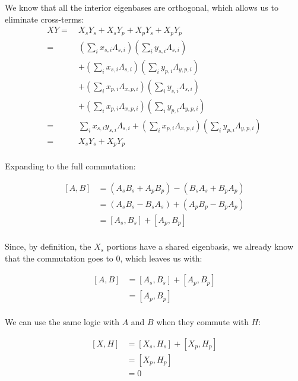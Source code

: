 \begin{answer}
\begin{answerpart}{\ctrois{}}
    We know that all the interior eigenbases are orthogonal, which
    allows us to eliminate cross-terms:
    \begin{equation}
      \begin{split}
        XY
        =\ &X_sY_s + X_sY_p + X_pY_s + X_pY_p\\
        =\ &(\sum_i x_{s,i}\Lambda_{s,i})(\sum_i y_{s,i}\Lambda_{s,i})\\
        &+ (\sum_i x_{s,i}\Lambda_{s,i})(\sum_i y_{p,i}\Lambda_{y,p,i})\\
        &+ (\sum_i x_{p,i}\Lambda_{x,p,i})(\sum_i y_{s,i}\Lambda_{s,i})\\
        &+ (\sum_i x_{p,i}\Lambda_{x,p,i})(\sum_i y_{p,i}\Lambda_{y,p,i})\\
        =\ &\sum_i x_{s,i}y_{s,i}\Lambda_{s,i}
        + (\sum_i x_{p,i}\Lambda_{x,p,i})(\sum_i y_{p,i}\Lambda_{y,p,i})\\
        =\ &X_sY_s + X_pY_p\\
      \end{split}
    \end{equation}

    Expanding to the full commutation:

    \begin{equation}
      \begin{split}
        [A, B]
        &= (A_sB_s + A_pB_p) - (B_sA_s + B_pA_p)\\
        &= (A_sB_s - B_sA_s) + (A_pB_p - B_pA_p)\\
        &= [A_s,B_s] + [A_p, B_p]\\
      \end{split}
    \end{equation}

    Since, by definition, the $X_s$ portions have a shared eigenbasis,
    we already know that the commutation goes to 0, which leaves us with:
    
    \begin{equation}
      \begin{split}
        [A, B]
        &= [A_s,B_s] + [A_p, B_p]\\
        &= [A_p, B_p]\\
      \end{split}
    \end{equation}

    We can use the same logic with $A$ and $B$ when they commute with
    $H$:

    \begin{equation}
      \begin{split}
        [X, H]
        &= [X_s,H_s] + [X_p, H_p]\\
        &= [X_p, H_p]\\
        &= 0\\
      \end{split}
    \end{equation}


\end{answerpart}
\end{answer}

